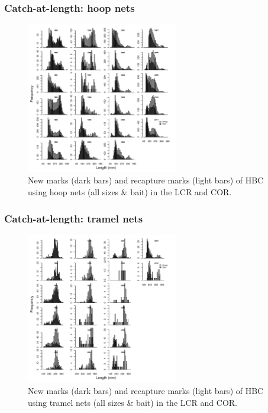 \documentclass{beamer}
\begin{document}
\begin{frame}
	\frametitle{Catch-at-length: hoop nets}
	\begin{figure}[htbp]
		\centering
			\includegraphics[height=2.6in]{../../FIGS/LSMR/fig:MarksAtLengthHOOP.pdf}
		\caption{New marks (dark bars) and recapture marks (light bars) of HBC using hoop nets (all sizes \& bait) in the LCR and COR.}
		\label{fig:FIGS_LSMR_fig:MarksAtLengthHOOP}
	\end{figure}
	
\end{frame}
\begin{frame}
	\frametitle{Catch-at-length: tramel nets}
	\begin{figure}[htbp]
		\centering
			\includegraphics[height=2.6in]{../../FIGS/LSMR/fig:MarksAtLengthGILL.pdf}
		\caption{New marks (dark bars) and recapture marks (light bars) of HBC using tramel nets (all sizes \& bait) in the LCR and COR.}
		\label{fig:FIGS_LSMR_fig:MarksAtLengthGILL}
	\end{figure}
\end{frame}

\end{document}

